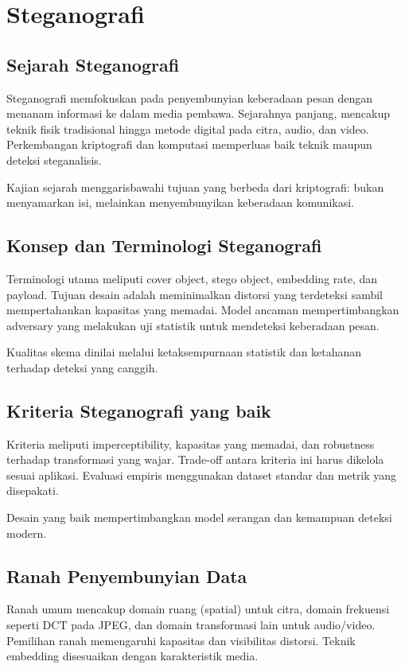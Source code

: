\documentclass[../main.tex]{subfiles}
\begin{document}
\chapter{Steganografi}

\section{Sejarah Steganografi}
Steganografi memfokuskan pada penyembunyian keberadaan pesan dengan menanam informasi ke dalam media pembawa. Sejarahnya panjang, mencakup teknik fisik tradisional hingga metode digital pada citra, audio, dan video. Perkembangan kriptografi dan komputasi memperluas baik teknik maupun deteksi steganalisis.

Kajian sejarah menggarisbawahi tujuan yang berbeda dari kriptografi: bukan menyamarkan isi, melainkan menyembunyikan keberadaan komunikasi.

\section{Konsep dan Terminologi Steganografi}
Terminologi utama meliputi cover object, stego object, embedding rate, dan payload. Tujuan desain adalah meminimalkan distorsi yang terdeteksi sambil mempertahankan kapasitas yang memadai. Model ancaman mempertimbangkan adversary yang melakukan uji statistik untuk mendeteksi keberadaan pesan.

Kualitas skema dinilai melalui ketaksempurnaan statistik dan ketahanan terhadap deteksi yang canggih.

\section{Kriteria Steganografi yang baik}
Kriteria meliputi imperceptibility, kapasitas yang memadai, dan robustness terhadap transformasi yang wajar. Trade-off antara kriteria ini harus dikelola sesuai aplikasi. Evaluasi empiris menggunakan dataset standar dan metrik yang disepakati.

Desain yang baik mempertimbangkan model serangan dan kemampuan deteksi modern.

\section{Ranah Penyembunyian Data}
Ranah umum mencakup domain ruang (spatial) untuk citra, domain frekuensi seperti DCT pada JPEG, dan domain transformasi lain untuk audio/video. Pemilihan ranah memengaruhi kapasitas dan visibilitas distorsi. Teknik embedding disesuaikan dengan karakteristik media.
\end{document}
